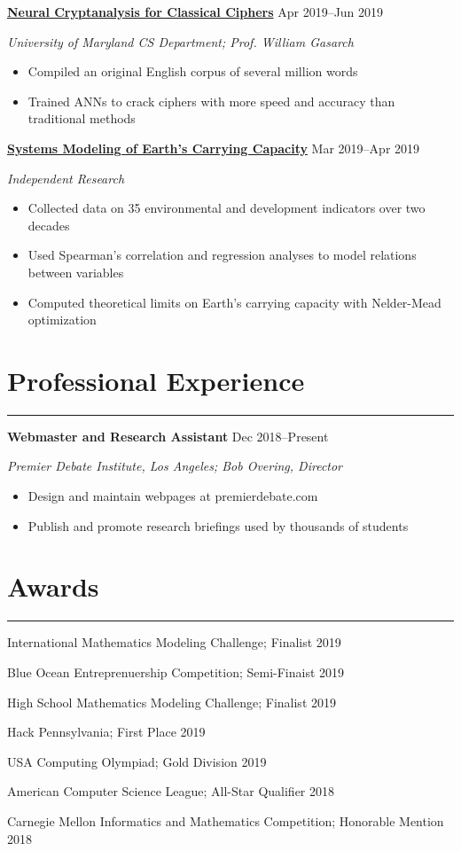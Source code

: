 \documentclass[11pt]{article}
\newcommand{\resumesection}[1]{\vspace{-0.3cm}\section*{\color{highlight}#1}\vspace{-0.3cm}\hrule\vspace{0.3cm}}
\begin{document}
\textbf{\href{https://github.com/petezh/Neural-Cryptanalysis}{Neural Cryptanalysis for Classical Ciphers}} \hfill Apr 2019--Jun 2019\par
\textit{University of Maryland CS Department; Prof. William Gasarch}
\begin{itemize}
	\item Compiled an original English corpus of several million words
	\item Trained ANNs to crack ciphers with more speed and accuracy than traditional methods
\end{itemize}\vspace{0.1cm}

\textbf{\href{https://github.com/gautomdas/IMMC-World4}{Systems Modeling of Earth's Carrying Capacity}} \hfill Mar 2019--Apr 2019\par
\textit{Independent Research}
\begin{itemize}
	\item Collected data on 35 environmental and development indicators over two decades
	\item Used Spearman's correlation and regression analyses to model relations between variables
	\item Computed theoretical limits on Earth's carrying capacity with Nelder-Mead optimization
\end{itemize}

\resumesection{Professional Experience}

\textbf{Webmaster and Research Assistant}   \hfill Dec 2018--Present \par
\textit{Premier Debate Institute, Los Angeles; Bob Overing, Director}
\begin{itemize}
	\item Design and maintain webpages at premierdebate.com
	\item Publish and promote research briefings used by thousands of students
\end{itemize}

\resumesection{Awards}

International Mathematics Modeling Challenge; Finalist \hfill 2019\par
Blue Ocean Entreprenuership Competition; Semi-Finaist \hfill 2019 \par
High School Mathematics Modeling Challenge; Finalist \hfill 2019\par
Hack Pennsylvania; First Place \hfill 2019\par
USA Computing Olympiad; Gold Division \hfill 2019\par
American Computer Science League; All-Star Qualifier \hfill 2018 \par 
Carnegie Mellon Informatics and Mathematics Competition; Honorable Mention \hfill 2018\par
\end{document}
